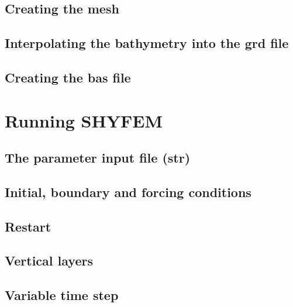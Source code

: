 \documentclass{report}
\begin{document}
	\section{Creating the mesh}
	

	\section{Interpolating the bathymetry into the grd file}
	

	\section{Creating the bas file}
	


\chapter{Running SHYFEM}

	

	\section{The parameter input file (str)}
	

	\section{Initial, boundary and forcing conditions}
	

	\section{Restart }
	

	\section{Vertical layers}
	

	\section{Variable time step}
	
\end{document}

